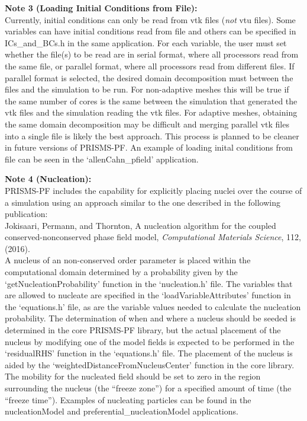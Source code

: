 \documentclass[10pt]{article} %
\begin{document}
\textbf{Note 3 (Loading Initial Conditions from File):} \\
Currently, initial conditions can only be read from vtk files (\emph{not} vtu files). Some variables can have initial conditions read from file and others can be specified in ICs\_and\_BCs.h in the same application. For each variable, the user must set whether the file(s) to be read are in serial format, where all processors read from the same file, or parallel format, where all processors read from different files. If parallel format is selected, the desired domain decomposition must between the files and the simulation to be run. For non-adaptive meshes this will be true if the same number of cores is the same between the simulation that generated the vtk files and the simulation reading the vtk files. For adaptive meshes, obtaining the same domain decomposition may be difficult and merging parallel vtk files into a single file is likely the best approach. This process is planned to be cleaner in future versions of PRISMS-PF. An example of loading inital conditions from file can be seen in the `allenCahn\_pfield' application.

\textbf{Note 4 (Nucleation):} \\
PRISMS-PF includes the capability for explicitly placing nuclei over the course of a simulation using an approach similar to the one described in the following publication: \\
Jokisaari, Permann, and Thornton, A nucleation algorithm for the coupled conserved-nonconserved phase field model, \emph{Computational Materials Science}, 112, (2016). \\
A nucleus of an non-conserved order parameter is placed within the computational domain determined by a probability given by the `getNucleationProbability' function in the `nucleation.h' file. The variables that are allowed to nucleate are specified in the `loadVariableAttributes' function in the `equations.h' file, as are the variable values needed to calculate the nucleation probability. The determination of when and where a nucleus should be seeded is determined in the core PRISMS-PF library, but the actual placement of the nucleus by modifying one of the model fields is expected to be performed in the `residualRHS' function in the `equations.h' file. The placement of the nucleus is aided by the `weightedDistanceFromNucleusCenter' function in the core library. The mobility for the nucleated field should be set to zero in the region surrounding the nucleus (the ``freeze zone'') for a specified amount of time (the ``freeze time''). Examples of nucleating particles can be found in the nucleationModel and preferential\_nucleationModel applications.
\end{document}
